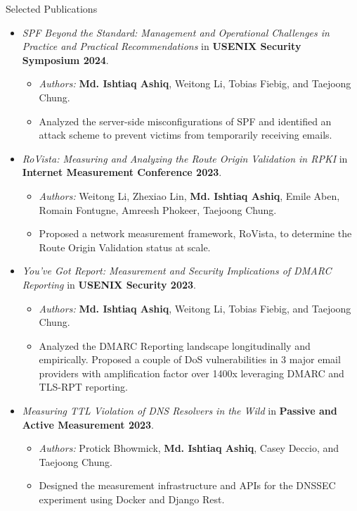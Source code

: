 \documentclass[]{mcdowellcv}
\begin{document}
	\begin{cvsection}{Selected Publications}
		\begin{cvsubsection}{}{}{}
			\begin{itemize}
				\item \textit{SPF Beyond the Standard: Management and Operational Challenges in Practice
and Practical Recommendations} in \textbf{USENIX Security Symposium 2024}.
				\begin{itemize}
					\item \textit{Authors:} \textbf{Md. Ishtiaq Ashiq}, Weitong Li, Tobias Fiebig, and Taejoong Chung.
					\item Analyzed the server-side misconfigurations of SPF and identified an attack scheme to prevent victims from temporarily receiving emails.
				\end{itemize}
				\item \textit{RoVista: Measuring and Analyzing the Route Origin Validation in RPKI} in \textbf{Internet Measurement Conference 2023}.
				\begin{itemize}
					\item \textit{Authors:} Weitong Li, Zhexiao Lin, \textbf{Md. Ishtiaq Ashiq}, Emile Aben, Romain Fontugne, Amreesh Phokeer, Taejoong Chung.
					\item Proposed a network measurement framework, RoVista, to determine the Route Origin Validation status at scale.
				\end{itemize}
				\item \textit{You’ve Got Report: Measurement and Security Implications of DMARC Reporting} in \textbf{USENIX Security 2023}.
				\begin{itemize}
					\item \textit{Authors:} \textbf{Md. Ishtiaq Ashiq}, Weitong Li, Tobias Fiebig, and Taejoong Chung.
					\item Analyzed the DMARC Reporting landscape longitudinally and empirically. Proposed a couple of DoS vulnerabilities
					in 3 major email providers with amplification factor over 1400x leveraging DMARC and TLS-RPT reporting.
				\end{itemize}
				\item \textit{Measuring TTL Violation of DNS Resolvers in the Wild} in \textbf{Passive and Active Measurement 2023}.
				\begin{itemize}
					\item \textit{Authors:} Protick Bhowmick, \textbf{Md. Ishtiaq Ashiq}, Casey Deccio, and Taejoong Chung.
					\item Designed the measurement infrastructure and APIs for the DNSSEC experiment using Docker and Django Rest.

\end{itemize}
\end{itemize}
\end{cvsubsection}
\end{cvsection}
\end{document}
